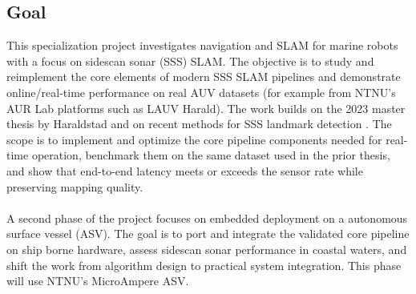 \subsection{Goal}
This specialization project investigates navigation and SLAM for marine robots with a focus on sidescan sonar (SSS) SLAM. The objective is to study and reimplement the core elements of modern SSS SLAM pipelines and demonstrate online/real-time performance on real AUV datasets (for example from NTNU's AUR Lab platforms such as LAUV Harald). The work builds on the 2023 master thesis by Haraldstad \cite{side_scan_sonar_master_thesis} and on recent methods for SSS landmark detection \cite{side_scan_sonar_paper}. The scope is to implement and optimize the core pipeline components needed for real-time operation, benchmark them on the same dataset used in the prior thesis, and show that end-to-end latency meets or exceeds the sensor rate while preserving mapping quality.
\\ \\
A second phase of the project focuses on embedded deployment on a autonomous surface vessel (ASV). The goal is to port and integrate the validated core pipeline on ship borne hardware, assess sidescan sonar performance in coastal waters, and shift the work from algorithm design to practical system integration. This phase will use NTNU's MicroAmpere ASV.


